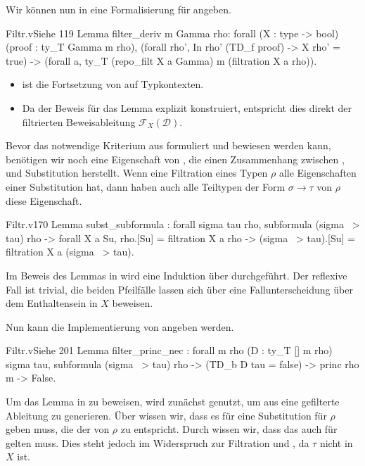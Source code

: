 Wir können nun in  eine Formalisierung für  angeben. 
\begin{code}{Filtr.v}{Siehe }{119}
Lemma filter_deriv {m Gamma rho}: forall (X : type -> bool) 
    (proof : ty_T Gamma m rho),
  (forall rho', In rho' (TD_f proof) -> X rho' = true) -> 
    (forall a, ty_T (repo_filt X a Gamma) m (filtration X a rho)). 
\end{code}
\begin{remark}
    \begin{itemize}
        \item {} ist die Fortsetzung von  auf Typkontexten.
        \item  Da der Beweis für das Lemma explizit  konstruiert, entspricht dies direkt der filtrierten Beweisableitung $\mathcal{F}_X(\mathcal{D})$.
    \end{itemize}
\end{remark}

Bevor das notwendige Kriterium aus  formuliert und bewiesen werden kann, benötigen wir noch eine Eigenschaft von , die einen Zusammenhang zwischen ,  und Substitution herstellt. Wenn eine Filtration eines Typen $\rho$ alle Eigenschaften einer Substitution hat, dann haben auch alle Teiltypen der Form $\sigma\to\tau$ von $\rho$ diese Eigenschaft.

\begin{code}{Filtr.v}{}{170}
Lemma subst_subformula : forall sigma tau rho, 
    subformula (sigma ~> tau) rho -> 
      forall X a Su, rho.[Su] = filtration X a rho ->
        (sigma ~> tau).[Su] = filtration X a (sigma ~> tau).
\end{code}
Im Beweis des Lemmas in  wird eine Induktion über  durchgeführt. Der reflexive Fall ist trivial, die beiden Pfeilfälle lassen sich über eine Fallunterscheidung über dem Enthaltensein in $X$ beweisen.

Nun kann die Implementierung von  angeben werden.
\begin{code}{Filtr.v}{Siehe }{201}
Lemma filter_princ_nec : forall m rho (D : ty_T [] m rho) sigma tau, 
    subformula (sigma ~> tau) rho -> (TD_b D tau = false) -> princ rho m -> 
      False.
\end{code}
Um das Lemma in  zu beweisen, wird zunächst  genutzt, um aus  eine gefilterte Ableitung  zu generieren. Über  wissen wir, dass es für  eine Substitution für $\rho$ geben muss, die der  von $\rho$ zu  entspricht. Durch  wissen wir, dass das auch für  gelten muss. Dies steht jedoch im Widerspruch zur Filtration und , da $\tau$ nicht in $X$ ist.

